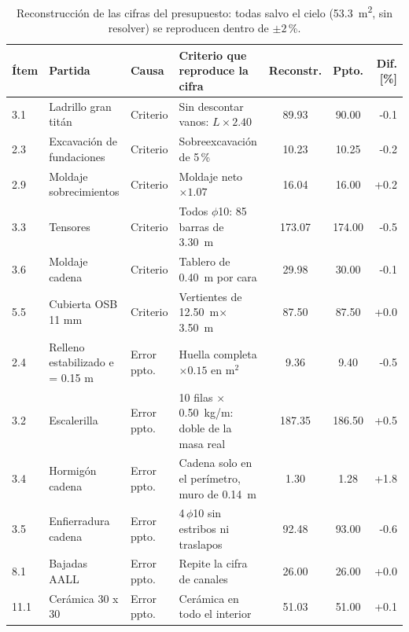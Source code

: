 \begin{table}
\centering\small
\begin{tabularx}{\linewidth}{lp{2.9cm}lXS[table-format=3.2]S[table-format=3.2]r}
\toprule
Ítem & Partida & Causa & Criterio que reproduce la cifra & {Reconstr.} & {Ppto.} & {Dif. [\%]}\\
 & Ladrillo gran titán & Criterio & Sin descontar vanos: $L\times2.40$ & \num{89.93} & \num{90.00} & -0.1\\
2.3 & Excavación de fundaciones & Criterio & Sobreexcavación de 5\,\% & \num{10.23} & \num{10.25} & -0.2\\
2.9 & Moldaje sobrecimientos & Criterio & Moldaje neto $\times1.07$ & \num{16.04} & \num{16.00} & +0.2\\
3.3 & Tensores & Criterio & Todos $\phi$10: 85 barras de \SI{3.30}{m} & \num{173.07} & \num{174.00} & -0.5\\
3.6 & Moldaje cadena & Criterio & Tablero de \SI{0.40}{m} por cara & \num{29.98} & \num{30.00} & -0.1\\
5.5 & Cubierta OSB 11 mm & Criterio & Vertientes de \SI{12.50}{m}$\times$\SI{3.50}{m} & \num{87.50} & \num{87.50} & +0.0\\
2.4 & Relleno estabilizado e = 0.15 m & Error ppto. & Huella completa $\times0.15$ en m$^2$ & \num{9.36} & \num{9.40} & -0.5\\
3.2 & Escalerilla & Error ppto. & 10 filas $\times$ \SI{0.50}{kg/m}: doble de la masa real & \num{187.35} & \num{186.50} & +0.5\\
3.4 & Hormigón cadena & Error ppto. & Cadena solo en el perímetro, muro de \SI{0.14}{m} & \num{1.30} & \num{1.28} & +1.8\\
3.5 & Enfierradura cadena & Error ppto. & 4\,$\phi$10 sin estribos ni traslapos & \num{92.48} & \num{93.00} & -0.6\\
8.1 & Bajadas AALL & Error ppto. & Repite la cifra de canales & \num{26.00} & \num{26.00} & +0.0\\
11.1 & Cerámica 30 x 30 & Error ppto. & Cerámica en todo el interior & \num{51.03} & \num{51.00} & +0.1\\
\bottomrule
\end{tabularx}
\caption{Reconstrucción de las cifras del presupuesto: todas salvo el cielo (\SI{53.3}{m^2}, sin resolver) se reproducen dentro de $\pm2$\,\%.}
\label{tab:conc}
\end{table}
